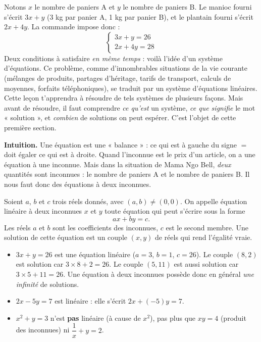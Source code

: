 \documentclass[11pt]{article}
\newcommand{\cle}[1]{{\popxbold\color{popdark}#1}}
\newcounter{popsec}
\newcounter{popsub}
\newcommand{\courssub}[1]{%
  \stepcounter{popsub}%
  \par\vspace{9pt}\noindent{\popxbold\fontsize{11.5}{13}\selectfont\color{popink}{\color{poporange}\thepopsec.\thepopsub}\hspace{6pt}#1}\par\nopagebreak\vspace{4pt}
}
\begin{document}
Notons $x$ le nombre de paniers A et $y$ le nombre de paniers B. Le manioc fourni s'écrit $3x + y$ (3 kg par panier A, 1 kg par panier B), et le plantain fourni s'écrit $2x + 4y$. La commande impose donc :
\[
\begin{cases} 3x + y = 26 \\ 2x + 4y = 28 \end{cases}
\]
Deux conditions à satisfaire \emph{en même temps} : voilà l'idée d'un \cle{système d'équations}. Ce problème, comme d'innombrables situations de la vie courante (mélanges de produits, partages d'héritage, tarifs de transport, calculs de moyennes, forfaits téléphoniques), se traduit par un système d'équations linéaires. Cette leçon t'apprendra à résoudre de tels systèmes de plusieurs façons. Mais avant de résoudre, il faut comprendre \emph{ce qu'est} un système, \emph{ce que signifie} le mot « solution », et \emph{combien} de solutions on peut espérer. C'est l'objet de cette première section.

\courssub{Équation linéaire à deux inconnues}

\textbf{Intuition.} Une équation est une « balance » : ce qui est à gauche du signe $=$ doit égaler ce qui est à droite. Quand l'inconnue est le prix d'un article, on a une équation à une inconnue. Mais dans la situation de Mama Ngo Bell, \emph{deux} quantités sont inconnues : le nombre de paniers A et le nombre de paniers B. Il nous faut donc des équations à deux inconnues.

\begin{definition}
Soient $a$, $b$ et $c$ trois réels donnés, avec $(a, b) \neq (0, 0)$. On appelle \cle{équation linéaire à deux inconnues} $x$ et $y$ toute équation qui peut s'écrire sous la forme
\[
ax + by = c.
\]
Les réels $a$ et $b$ sont les \cle{coefficients} des inconnues, $c$ est le \cle{second membre}. Une \cle{solution} de cette équation est un couple $(x, y)$ de réels qui rend l'égalité vraie.
\end{definition}

\begin{exemplebox}
\begin{itemize}
\item $3x + y = 26$ est une équation linéaire ($a = 3$, $b = 1$, $c = 26$). Le couple $(8, 2)$ est solution car $3 \times 8 + 2 = 26$. Le couple $(5, 11)$ est aussi solution car $3 \times 5 + 11 = 26$. Une équation à deux inconnues possède donc en général \emph{une infinité} de solutions.
\item $2x - 5y = 7$ est linéaire : elle s'écrit $2x + (-5)y = 7$.
\item $x^2 + y = 3$ n'est \textbf{pas} linéaire (à cause de $x^2$), pas plus que $xy = 4$ (produit des inconnues) ni $\dfrac{1}{x} + y = 2$.
\end{itemize}
\end{exemplebox}
\end{document}

